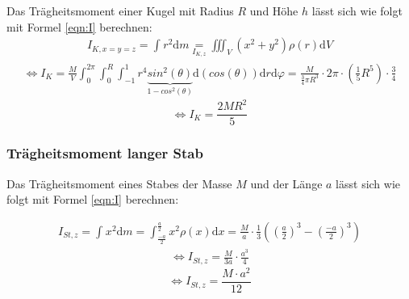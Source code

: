 Das Trägheitsmoment einer Kugel mit Radius $R$ und Höhe $h$ lässt sich wie folgt mit Formel \ref{eqn:I} berechnen:
\begin{align*}
    I_{K,x=y=z} = \int_{}^{}r^2 \mathrm{d}m \underset{I_{K,z}}{=} \iiint_{V}^{} (x^2 + y^2) \rho(r) \mathrm{d}V    
\end{align*}
\begin{align*}
    \Leftrightarrow I_K = \frac{M}{V} \int_{0}^{2\pi} \int_{0}^{R} \int_{-1}^{1}r^4 \underbrace{sin^2(\theta)}_{\text{$1 - cos^2(\theta)$}}  \mathrm{d}(cos(\theta)) \mathrm{d}r \mathrm{d}\varphi = \frac{M}{\frac{3}{4} \pi R^3} \cdot 2\pi \cdot \left(\frac{1}{5}R^5 \right) \cdot \frac{3}{4} 
\end{align*}
\begin{equation}
    \Leftrightarrow I_K = \frac{2MR^2}{5}
\end{equation}

\subsubsection{Trägheitsmoment langer Stab}

Das Trägheitsmoment eines Stabes der Masse $M$ und der Länge $a$ lässt sich wie folgt mit Formel \ref{eqn:I} berechnen:

\begin{align*}
    I_{St,z} = \int_{}^{}x^2 \mathrm{d}m = \int_{\frac{-a}{2}}^{\frac{a}{2}} x^2 \rho(x) \mathrm{d}x = \frac{M}{a} \cdot \frac{1}{3} \left( \left(\frac{a}{2} \right)^3 - \left(\frac{-a}{2} \right)^3 \right)
\end{align*}
\begin{align*}
    \Leftrightarrow I_{St,z} = \frac{M}{3a} \cdot \frac{a^3}{4}
\end{align*}
\begin{equation}
    \Leftrightarrow I_{St,z} = \frac{M \cdot a^2}{12}
\end{equation}

\cite{sample}
\newpage